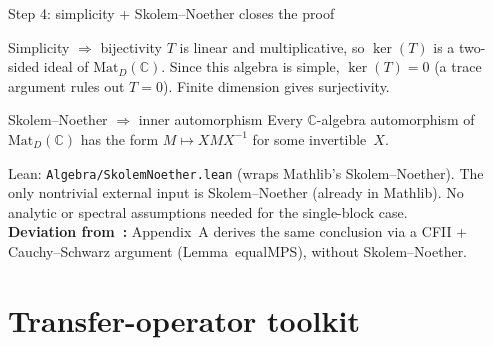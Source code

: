 \documentclass[aspectratio=169,10pt]{beamer}
\newcommand{\Mat}{\mathrm{Mat}}
\begin{document}
\begin{frame}{Step 4: simplicity + Skolem--Noether closes the proof}
    \vspace{-0.6em}

    \begin{block}{Simplicity $\Rightarrow$ bijectivity}
        $T$ is linear and multiplicative, so $\ker(T)$ is a two-sided ideal of $\Mat_D(\mathbb{C})$.
        Since this algebra is simple, $\ker(T)=0$ (a trace argument rules out $T=0$).
        Finite dimension gives surjectivity.
    \end{block}

    \begin{block}{Skolem--Noether $\Rightarrow$ inner automorphism}
        Every $\mathbb{C}$-algebra automorphism of $\Mat_D(\mathbb{C})$
        has the form $M\mapsto XMX^{-1}$ for some invertible~$X$.
    \end{block}

    \textcolor{dimwhite}{\footnotesize Lean: \texttt{Algebra/SkolemNoether.lean} (wraps Mathlib's Skolem--Noether).
        The only nontrivial external input is Skolem--Noether (already in Mathlib).
        No analytic or spectral assumptions needed for the single-block case.\\
        \textbf{Deviation from~\cite{Cirac2017Annals}:} Appendix~A derives the same conclusion via a CFII + Cauchy--Schwarz argument (Lemma~equalMPS), without Skolem--Noether.}
\end{frame}

\section{Transfer-operator toolkit}
\end{document}
